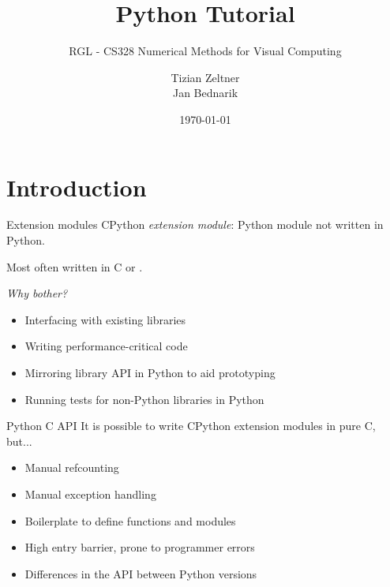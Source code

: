 \documentclass[10pt]{beamer}
\title{Python Tutorial}
\subtitle{RGL - CS328 Numerical Methods for Visual Computing}
\date{\today}
\author{Tizian Zeltner\\
Jan Bednarik}
\newcommand\cpp[1]{\cpluspluslogo #1}
\begin{document}
\maketitle


\section{Introduction}


\begin{frame}{Extension modules}
    CPython \textit{extension module}: Python module not written in Python.

    \pause

    Most often written in C or \cpp{}.

    \pause

    \hrulefill

    \textit{Why bother?}

    \begin{itemize}
        \item \pause Interfacing with existing libraries
        \item \pause Writing performance-critical code
        \item \pause Mirroring library API in Python to aid prototyping
        \item \pause Running tests for non-Python libraries in Python
    \end{itemize}
\end{frame}


\begin{frame}{Python C API}
    It is possible to write CPython extension modules in pure C, but...

    \begin{itemize}
        \item \pause Manual refcounting
        \item \pause Manual exception handling
        \item \pause Boilerplate to define functions and modules
        \item \pause High entry barrier, prone to programmer errors
        \item \pause Differences in the API between Python versions
    \end{itemize}
\end{frame}
\end{document}
